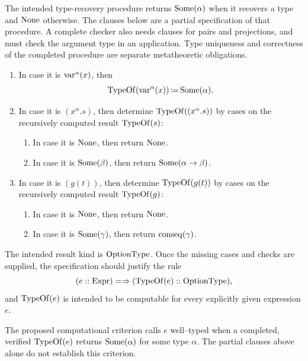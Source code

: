 \begin{definition}[$\TypeOf::(\Expr\cimplies\OptionType)$] \label{def:TypeOf}
The intended type-recovery procedure returns $\mathrm{Some}(\alpha)$ when it
recovers a type and $\mathrm{None}$ otherwise. The clauses below are a partial
specification of that procedure. A complete checker also needs clauses for
pairs and projections, and must check the argument type in an application.
Type uniqueness and correctness of the completed procedure are separate
metatheoretic obligations.
\begin{enumerate}
\item In case it is ${\textrm{var}}^\alpha(x)$, then \[
\mathrm{TypeOf}({\textrm{var}}^\alpha(x))
\,{\coloneqq}\,
\mathrm{Some}(\alpha).
\]

\item In case it is $(x^\alpha.s)$, then
determine $\mathrm{TypeOf}((x^\alpha.s))$ by cases on the recursively computed
result $\mathrm{TypeOf}(s)$:
\begin{enumerate}
\item In case it is $\mathrm{None}$, then return $\mathrm{None}$.
\item In case it is $\mathrm{Some}(\beta)$, then return $\mathrm{Some}(\alpha\to\beta)$.
\end{enumerate}
\item In case it is $(g(t))$, then
determine $\mathrm{TypeOf}(g(t))$ by cases on the recursively computed
result $\mathrm{TypeOf}(g)$:
\begin{enumerate}
\item In case it is $\mathrm{None}$, then return $\mathrm{None}$.
\item In case it is $\mathrm{Some}(\gamma)$, then return $\mathrm{conseq}(\gamma)$.
\end{enumerate}
\end{enumerate}
The intended result kind is $\mathrm{OptionType}$. Once the missing cases and
checks are supplied, the specification should justify the rule
\[
(e::\mathrm{Expr}) =\Rightarrow (\mathrm{TypeOf}(e)::\mathrm{OptionType}),
\]
and $\mathrm{TypeOf}(e)$ is intended to be computable for every explicitly given expression $e$.
\end{definition}

\begin{definition}
The proposed computational criterion calls $e$ well--typed when a
completed, verified $\mathrm{TypeOf}(e)$ returns $\mathrm{Some}(\alpha)$ for some type
$\alpha$. The partial clauses above alone do not establish this criterion.
\end{definition}

